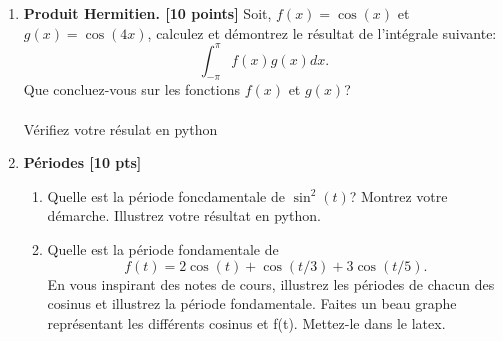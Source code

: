 \documentclass{article}
\begin{document}
\begin{enumerate}

\item {\bf Produit Hermitien. [10 points]} Soit, 
  $f(x) = \cos(x)$ et $g(x) = \cos(4x)$,
  calculez et démontrez le résultat de l'intégrale suivante: 
  $$
  \int_{-\pi}^{\pi} f(x) g(x) dx.
  $$
  Que concluez-vous sur les fonctions $f(x)$ et $g(x)$?
  \\
  \\
  Vérifiez votre résulat en python
\vspace{1cm}


\item  {\bf Périodes [10 pts]}
  \begin{enumerate}
    \vspace{0.5cm}
  \item Quelle est la période foncdamentale de $\sin^2(t)$? Montrez votre
    démarche. Illustrez votre résultat en python.
    \vspace{1cm}    
  \item Quelle est la période fondamentale de 
    $$
    f(t) = 2\cos(t) +    \cos(t/3) + 3\cos(t/5).  
    $$
    En vous inspirant des notes de cours, illustrez
    les périodes de chacun des cosinus et illustrez la période
    fondamentale. Faites un beau graphe représentant les différents
    cosinus et f(t). Mettez-le dans le latex.

\end{enumerate}

\newpage 


\end{enumerate}
\end{document}
